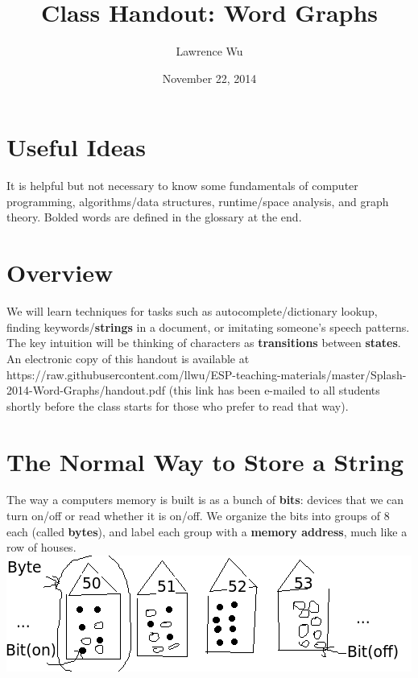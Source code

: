 \documentclass[12pt]{article}
\begin{document}
\title{Class Handout: Word Graphs}
\author{Lawrence Wu}
\date{November 22, 2014}

\maketitle

\section{Useful Ideas}
It is helpful but not necessary to know some fundamentals of computer programming, algorithms/data structures, runtime/space analysis, and graph theory. Bolded words are defined in the glossary at the end. 

\section{Overview}
We will learn techniques for tasks such as autocomplete/dictionary lookup, finding keywords/\textbf{strings} in a document, or imitating someone's speech patterns. The key intuition will be thinking of characters as \textbf{transitions} between \textbf{states}. \\

An electronic copy of this handout is available at https://raw.githubusercontent.com/llwu/ESP-teaching-materials/master/Splash-2014-Word-Graphs/handout.pdf (this link has been e-mailed to all students shortly before the class starts for those who prefer to read that way).

\section{The Normal Way to Store a String}
The way a computers memory is built is as a bunch of \textbf{bits}: devices that we can turn on/off or read whether it is on/off. We organize the bits into groups of $8$ each (called \textbf{bytes}), and label each group with a \textbf{memory address}, much like a row of houses. \\

\includegraphics{memdiagram.png} \\
\end{document}
